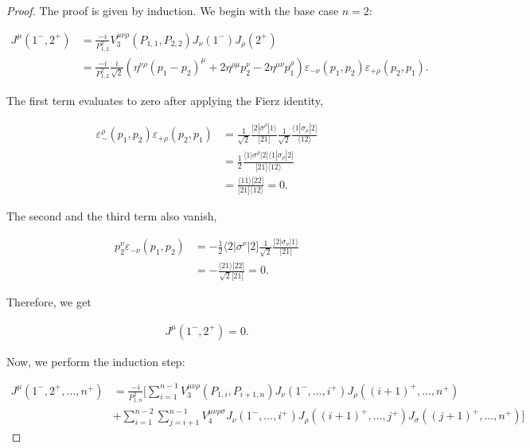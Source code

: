 \documentclass{article}
\theoremstyle{definition}
\numberwithin{equation}{section}
\begin{document}
\begin{proof}

    The proof is given by induction. We begin with the base case $n=2$:

    \begin{align*}
        J^{\mu}(1^{-}, 2^{+}) &= \frac{-i}{P_{1,2}^2} V_3^{\mu \nu \rho}(P_{1,1}, P_{2,2}) J_{\nu}(1^{-}) J_{\rho}(2^{+}) \\
        &= \frac{-i}{P_{1,2}^2} \frac{i}{\sqrt{2}} \left( \eta^{\nu \rho} \left( p_1 - p_2 \right)^{\mu}  + 2\eta^{\rho \mu}p_2^{\nu} -2\eta^{\mu \nu}p_1^{\rho} \right) \varepsilon_{-\nu}(p_1,p_2) \varepsilon_{+\rho}(p_2,p_1).
    \end{align*}

    The first term evaluates to zero after applying the Fierz identity,

    \begin{align*}
        \varepsilon_{-}^{\rho}(p_1,p_2) \varepsilon_{+\rho}(p_2,p_1) &= \frac{1}{\sqrt{2}} \frac{ \lbrack 2 | \overline{\sigma}^{\rho} | 1 \rangle }{ \lbrack 21 \rbrack } \frac{1}{\sqrt{2}} \frac{ \langle 1 | \sigma_{\rho} | 2 \rbrack }{ \langle 12 \rangle } \\
        &= \frac{1}{2} \frac{ \langle 1 | \sigma^{\rho} | 2 \rbrack \langle 1 | \sigma_{\rho} | 2 \rbrack }{ \lbrack 21 \rbrack \langle 12 \rangle } \\
        &= \frac{ \langle 11 \rangle \lbrack 22 \rbrack }{ \lbrack 21 \rbrack \langle 12 \rangle } = 0.
    \end{align*}

    The second and the third term also vanish,

    \begin{align*}
        p_2^{\nu} \varepsilon_{-\nu}(p_1,p_2) &= - \frac{1}{2} \langle 2 | \sigma^{\nu} | 2 \rbrack \frac{1}{\sqrt{2}} \frac{ \lbrack 2 | \overline{\sigma}_{\nu} | 1 \rangle }{ \lbrack 21 \rbrack } \\
        &= - \frac{ \langle 21 \rangle \lbrack 22 \rbrack }{\sqrt{2} \lbrack 21 \rbrack } = 0.
    \end{align*}

    Therefore, we get

    \begin{align}
        J^{\mu}(1^{-}, 2^{+}) = 0. \label{eq:caseneq2}
    \end{align}

    Now, we perform the induction step:

    \begin{align*}
        J^{\mu}(1^{-}, 2^{+}, \dots , n^{+}) &= \frac{-i}{P_{1,n}^2} \Biggl[ \sum_{i=1}^{n-1} V_3^{\mu \nu \rho}(P_{1,i}, P_{i+1,n}) J_{\nu}(1^{-}, \dots, i^{+}) J_{\rho}((i+1)^{+}, \dots , n^{+}) \\
        &+ \sum_{i=1}^{n-2} \sum_{j=i+1}^{n-1} V_4^{\mu \nu \rho \sigma} J_{\nu}(1^{-}, \dots, i^{+}) J_{\rho}((i+1)^{+}, \dots, j^{+})J_{\sigma}((j+1)^{+}, \dots, n^{+}) \Biggr]
    \end{align*}


\end{proof}
\end{document}
